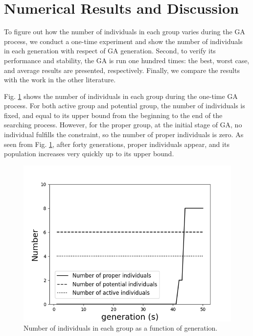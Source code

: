 \documentclass[10pt, journal]{IEEEtran}
\begin{document}
\section{Numerical Results and Discussion}
To figure out how the number of individuals in each group varies during the GA
process, we conduct a one-time experiment and show the number of individuals
in each generation with respect of GA generation. Second, to verify its
performance and stability, the GA is run one hundred times: the best, worst
case, and average results are presented, respectively. Finally, we compare
the results with the work in the other literature.


Fig. \ref{fig:group} shows the number of individuals in each group during the
one-time GA process.  For both active group and potential group, the number of
individuals is fixed, and equal to its upper bound from the beginning to the
end of the searching process. However, for the proper group, at the initial
stage of GA, no individual fulfills the constraint, so the number of proper
individuals is zero. As seen from Fig. \ref{fig:group}, after forty
generations, proper individuals appear, and its population increases very
quickly up to its upper bound.

\begin{figure}[!b]
	\centering
	\includegraphics[width=\linewidth]{group_number.png}
	\caption{Number of individuals in each group as a function of generation.}
	\label{fig:group}
\end{figure}
\end{document}
